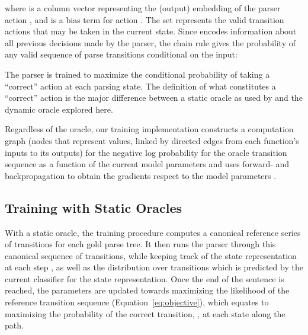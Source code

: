 \documentclass[11pt]{article}
\begin{document}
where  is a column vector representing the (output) embedding of
the parser action , and  is a bias term for action . The set
 represents the valid transition actions that may be taken in
the current state.
Since  encodes information about all
previous decisions made by the parser, the chain rule gives
the probability of any valid sequence of parse transitions  conditional on the input:




The parser is trained to maximize the conditional probability of taking a
``correct'' action at each parsing state.  The definition of what
constitutes a ``correct'' action is the major difference between a static oracle
as used by  and the dynamic oracle explored here.

Regardless of the oracle, our training implementation constructs a
computation graph (nodes that represent values, linked by directed
edges from each function's inputs to its outputs) for the negative log
probability for the oracle transition sequence as a function of the current
model parameters and uses forward- and
backpropagation to obtain the gradients respect to the model parameters
\cite[section 4]{lecun:1998}. 

\subsection{Training with Static Oracles} \label{static-oracle}
With a static oracle, the training procedure computes a canonical
reference series of transitions for each gold parse tree. It then runs the parser through
this canonical sequence of transitions, while keeping track of the state
representation  at each step , as well as the distribution over transitions  which is predicted by the current classifier for the state representation.
Once the end of the sentence is reached, the parameters are  updated towards
maximizing the likelihood of the reference transition sequence
(Equation~\ref{eq:objective}), which equates to maximizing the
probability of the correct transition,
, at each state along the path.
\end{document}
